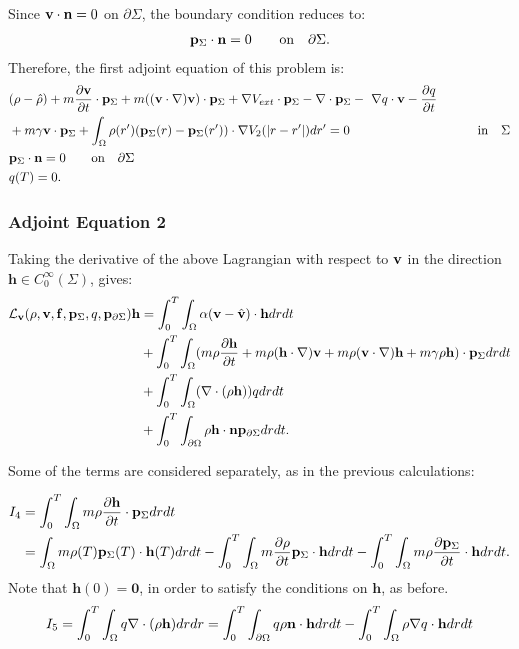 Since $\mathbf{v} \cdot \mathbf{n} =0$ on $ \partial \Sigma$, the boundary condition reduces to:
\begin{align*}
\mathbf{p}_\Sigma \cdot \mathbf{n} = 0 \qquad \text{on} \quad \partial \Sigma.
\end{align*}
Therefore, the first adjoint equation of this problem is:
\begin{align*}
&(\rho - \hat {\rho}) +m  \frac{\partial \mathbf{v}}{\partial t}\cdot \mathbf{p}_\Sigma + m ( (\mathbf{v} \cdot \nabla)\mathbf{v}) \cdot \mathbf{p}_\Sigma+ \nabla V_{ext}\cdot \mathbf{p}_\Sigma -\nabla\cdot \mathbf{p}_\Sigma  - \ \nabla q \cdot \mathbf{v}  -  \frac{\partial q}{\partial t}\\
&+ m \gamma \mathbf{v} \cdot \mathbf{p}_\Sigma + \int_\Omega  \rho(r')(\mathbf{p}_\Sigma(r) - \mathbf{p}_\Sigma(r')) \cdot\nabla V_2(|r-r'|)   dr'  =0 \qquad\qquad\qquad\qquad\qquad \text{in} \quad \Sigma \\
& \mathbf{p}_\Sigma \cdot \mathbf{n} = 0 \qquad \text{on} \quad \partial \Sigma\\
 &q(T) = {0} .
\end{align*}

\subsubsection*{Adjoint Equation 2}
Taking the derivative of the above Lagrangian with respect to $\mathbf{v}$ in the direction $\mathbf{h} \in C_0^\infty(\Sigma)$, gives:
\begin{align*}
\mathcal{L}_{\mathbf{v}}(\rho,\mathbf{v},\mathbf{f},\mathbf{p}_\Sigma,q,\mathbf{p}_{\partial \Sigma})\mathbf{h} &= \int_0^T \int_\Omega 
 \alpha(\mathbf{v} - \hat {\mathbf{v}})\cdot \mathbf{h} drdt  \\
&+ \int_0^T \int_\Omega (m \rho \frac{\partial \mathbf{h} }{\partial t} + m \rho (\mathbf{h} \cdot \nabla)\mathbf{v} + m \rho (\mathbf{v} \cdot \nabla)\mathbf{h} + m \gamma \rho \mathbf{h}) \cdot \mathbf{p}_\Sigma dr dt\\
& + \int_0^T \int_\Omega ( \nabla \cdot (\rho \mathbf{h})) q dr dt\\ 
& +\int_0^T \int_{\partial\Omega} \rho \mathbf{h} \cdot \mathbf{n} \mathbf{p}_{\partial \Sigma} dr dt.
\end{align*}

Some of the terms are considered separately, as in the previous calculations:

\begin{align*}
I_4 &= \int_0^T \int_\Omega m \rho \frac{\partial \mathbf{h} }{\partial t} \cdot \mathbf{p}_\Sigma dr dt \\
&= \int_\Omega m \rho(T) \mathbf{p}_\Sigma(T) \cdot \mathbf{h}(T) dr dt - \int_0^T \int_\Omega  m\frac{\partial \rho}{\partial t} \mathbf{p}_\Sigma \cdot \mathbf{h} dr dt - \int_0^T \int_\Omega m \rho \frac{\partial \mathbf{p}_\Sigma}{\partial t} \cdot \mathbf{h} dr dt.
\end{align*}
Note that $\mathbf{h}(0)=\mathbf{0}$, in order to satisfy the conditions on $\mathbf{h}$, as before.
\begin{align*}
I_5= \int_0^T \int_\Omega q\nabla \cdot ( \rho \mathbf{h}) dr dr = \int_0^T \int_{\partial \Omega} q \rho  \mathbf{n}\cdot \mathbf{h} dr dt - \int_0^T \int_\Omega \rho\nabla q \cdot  \mathbf{h} dr dt
\end{align*}


